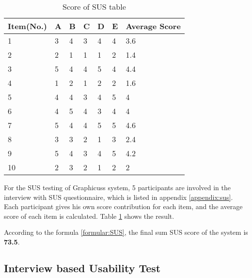 \begin{table}[!htbp]
\centering
\begin{tabularx}{\textwidth}{@{}lXXXXXl@{}}
\toprule
Item(No.)   & A  & B  & C  & D  & E          & Average Score        \\ \midrule
1               & 3  & 4  & 3  & 4  & 4          & 3.6                     \\
2               & 2  & 1  & 1  & 1  & 2          & 1.4                     \\
3               & 5  & 4  & 4  & 5  & 4          & 4.4                     \\
4               & 1  & 2  & 1  & 2  & 2          & 1.6                     \\
5               & 4  & 4  & 3  & 4  & 5          & 4                     \\
6               & 4  & 5  & 4  & 3  & 4          & 4                     \\
7               & 5  & 4  & 4  & 5  & 5          & 4.6                     \\
8               & 3  & 3  & 2  & 1  & 3          & 2.4                     \\
9               & 5  & 4  & 3  & 4  & 5          & 4.2                     \\
10              & 2  & 3  & 2  & 1  & 2          & 2                     \\ \bottomrule        
\end{tabularx}
\caption{Score of SUS table}
\label{table:score-sus}
\end{table}

For the SUS testing of Graphicuss system, 5 participants are involved in the interview with SUS questionnaire, which is listed in appendix \ref{appendix:sus}. Each participant gives his own score contribution for each item, and the average score of each item is calculated. Table \ref{table:score-sus} shows the result.

According to the formula \ref{formular:SUS}, the final sum SUS score of the system is \textbf{73.5}.

\cite{bangor2009determining} \cite{gackenheimer2015core}\cite{barron1998minimum}\cite{grunwald2005advances}\cite{ferraiolo2000scalable}\cite{fette2011websocket}\cite{geary2012core}\cite{richardson2008restful}\cite{pautasso2008restful}\cite{pimentel2012communicating}



\subsection{Interview based Usability Test}